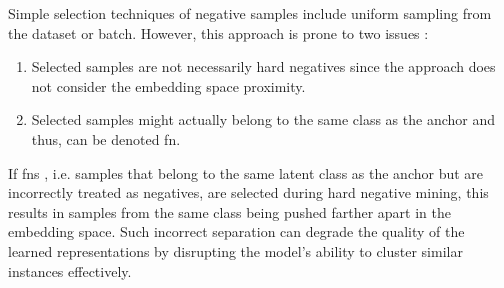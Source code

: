 Simple selection techniques of negative samples include uniform sampling from the dataset or batch.
However, this approach is prone to two issues \citet{robinson_contrastive_2021,mining_potential_2024}:
\begin{enumerate}
    \item Selected samples are not necessarily hard negatives since the approach does not consider the embedding space proximity.
    \item Selected samples might actually belong to the same class as the anchor and thus, can be denoted \ac{fn}.
\end{enumerate}

If \acp{fn} \cite{grape_2024,curricular_weighting_2024,progcl_2022}, i.e. 
samples that belong to the same latent class as the anchor but are incorrectly treated as negatives, 
are selected during hard negative mining, 
this results in samples from the same class being pushed farther apart in the embedding space. 
Such incorrect separation can degrade the quality of the learned representations 
by disrupting the model's ability to cluster similar instances effectively.
